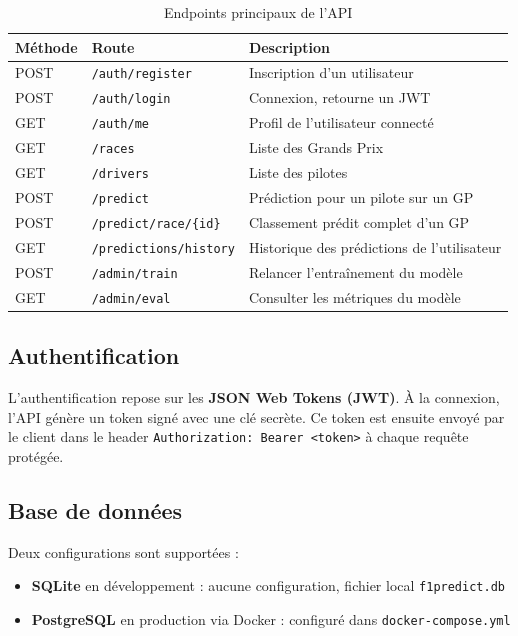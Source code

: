 \documentclass[12pt, a4paper]{article}
\begin{document}
\begin{table}[H]
\centering
\begin{tabularx}{\textwidth}{llX}
\toprule
\textbf{Méthode} & \textbf{Route} & \textbf{Description} \\
\midrule
POST & \texttt{/auth/register}         & Inscription d'un utilisateur \\
POST & \texttt{/auth/login}            & Connexion, retourne un JWT \\
GET  & \texttt{/auth/me}               & Profil de l'utilisateur connecté \\
GET  & \texttt{/races}                 & Liste des Grands Prix \\
GET  & \texttt{/drivers}               & Liste des pilotes \\
POST & \texttt{/predict}               & Prédiction pour un pilote sur un GP \\
POST & \texttt{/predict/race/\{id\}}   & Classement prédit complet d'un GP \\
GET  & \texttt{/predictions/history}   & Historique des prédictions de l'utilisateur \\
POST & \texttt{/admin/train}           & Relancer l'entraînement du modèle \\
GET  & \texttt{/admin/eval}            & Consulter les métriques du modèle \\
\bottomrule
\end{tabularx}
\caption{Endpoints principaux de l'API}
\end{table}

\subsection{Authentification}

L'authentification repose sur les \textbf{JSON Web Tokens (JWT)}. À la connexion, l'API génère un token signé avec une clé secrète. Ce token est ensuite envoyé par le client dans le header \texttt{Authorization: Bearer <token>} à chaque requête protégée.

\subsection{Base de données}

Deux configurations sont supportées :
\begin{itemize}
    \item \textbf{SQLite} en développement : aucune configuration, fichier local \texttt{f1predict.db}
    \item \textbf{PostgreSQL} en production via Docker : configuré dans \texttt{docker-compose.yml}
\end{itemize}
\end{document}
